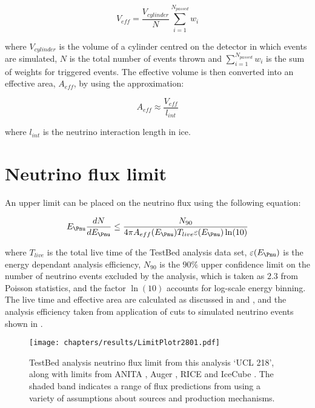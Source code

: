 \begin{equation}
  V_{eff} = \frac {V_{cylinder}}{N} \sum_{i=1}^{N_{passed}} w_{i}
\end{equation}

\noindent where $V_{cylinder}$ is the volume of a cylinder centred on the detector in which events are simulated, $N$ is the total number of events thrown and $\sum_{i=1}^{N_{passed}} w_{i}$ is the sum of weights for triggered events. The effective volume is then converted into an effective area, $A_{eff}$, by using the approximation:

\begin{equation}
  A_{eff} \approx \frac{V_{eff}}{l_{int}}
\end{equation}

\noindent where $l_{int}$ is the neutrino interaction length in ice. 

\section{Neutrino flux limit}
\label{sec:Results:Limit}

An upper limit can be placed on the neutrino flux using the following equation:

\begin{equation}
  E_{\Pnu} \frac {dN}{dE_{\Pnu}} \leq \frac{N_{90}}{4\pi A_{eff}(E_{\Pnu}) T_{live} \varepsilon(E_{\Pnu}) \ln(10)}
\end{equation}

\noindent where $T_{live}$ is the total live time of the TestBed analysis data set, $\varepsilon(E_{\Pnu})$ is the energy dependant analysis efficiency, $N_{90}$ is the $90\%$ upper confidence limit on the number of neutrino events excluded by the analysis, which is taken as 2.3 from Poisson statistics, and the factor $\ln(10)$ accounts for log-scale energy binning. The live time and effective area are calculated as discussed in  and , and the analysis efficiency taken from application of cuts to simulated neutrino events shown in . 



\begin{figure}[htpb]
  \texttt{[image: chapters/results/LimitPlotr2801.pdf]}
  \caption{TestBed analysis neutrino flux limit from this analysis `UCL 218', along with limits from ANITA \cite{PhysRevD.82.022004}, Auger \cite{Abraham:2009eh}, RICE \cite{PhysRevD.73.082002} and IceCube \cite{PhysRevD.88.112008}. The shaded band indicates a range of flux predictions from \cite{Kotera.2010} using a variety of assumptions about sources and production mechanisms.}
  \label{fig:Results:Limit-Plot}
\end{figure}

